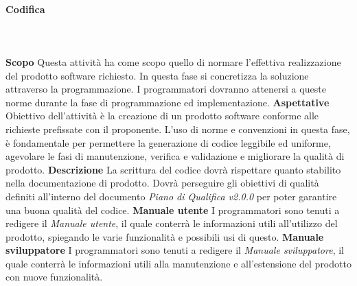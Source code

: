 		\paragraph{Codifica} \mbox{}\\ \mbox{}\\
			\textbf{Scopo} \newline \newline
			Questa attività ha come scopo quello di normare l'effettiva realizzazione del prodotto software richiesto. In questa fase si concretizza la soluzione attraverso la programmazione. I programmatori dovranno attenersi a queste norme durante la fase di programmazione ed implementazione. \newline \newline
			\textbf{Aspettative} \newline \newline
			Obiettivo dell'attività è la creazione di un prodotto software conforme alle richieste	prefissate con il proponente.
			L'uso di norme e convenzioni in questa fase, è fondamentale per permettere la generazione di codice leggibile ed uniforme,  agevolare le fasi di manutenzione,  verifica e validazione e migliorare la qualità di prodotto. \newline \newline
			\textbf{Descrizione} \newline \newline
			La scrittura del codice dovrà rispettare quanto stabilito nella documentazione di prodotto. Dovrà perseguire gli obiettivi di qualità definiti all'interno del documento \textit{Piano di Qualifica v2.0.0} per poter garantire una buona qualità del codice. \newline \newline
			\textbf{Manuale utente} \newline \newline
			I programmatori sono tenuti a redigere il \textit{Manuale utente}, il quale conterrà le informazioni utili all'utilizzo del prodotto, spiegando le varie funzionalità e possibili usi di questo. \newline \newline
			\textbf{Manuale sviluppatore} \newline \newline
			I programmatori sono tenuti a redigere il \textit{Manuale sviluppatore}, il quale conterrà le informazioni utili alla manutenzione e all'estensione del prodotto con nuove funzionalità. \newline \newline
